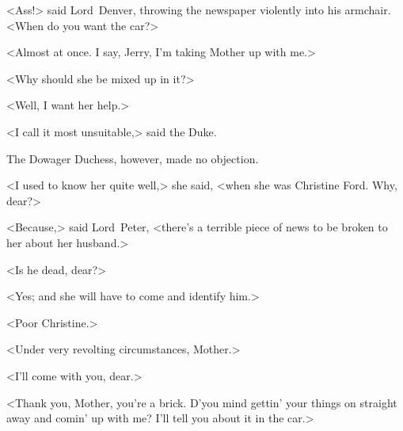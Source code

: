 <Ass!> said Lord~Denver, throwing the newspaper violently into his armchair. <When do you want the car?>

<Almost at once. I say, Jerry, I'm taking Mother up with me.>

<Why should she be mixed up in it?>

<Well, I want her help.>

<I call it most unsuitable,> said the Duke.

The Dowager Duchess, however, made no objection.

<I used to know her quite well,> she said, <when she was Christine Ford. Why, dear?>

<Because,> said Lord~Peter, <there's a terrible piece of news to be broken to her about her husband.>

<Is he dead, dear?>

<Yes; and she will have to come and identify him.>

<Poor Christine.>

<Under very revolting circumstances, Mother.>

<I'll come with you, dear.>

<Thank you, Mother, you're a brick. D'you mind gettin' your things on straight away and comin' up with me? I'll tell you about it in the car.>